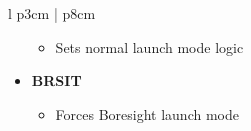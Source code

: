 \documentclass[8pt,usenames,dvipsnames,twoside]{article}
\begin{document}
\begin{center}
\begin{longtable}{l p{3cm} | p{8cm}}
\begin{minipage}[t]{\linewidth}
\begin{itemize}
\begin{itemize}
							\item Sets normal launch mode logic
						\end{itemize}
						\item \textbf{BRSIT}
						\begin{itemize}
							\item Forces Boresight launch mode
						\end{itemize}
					\end{itemize}
				\end{minipage} \\
				\bottomrule
			\end{longtable}
		\end{center}
		\begin{center}
		\end{center}
		
\end{document}
